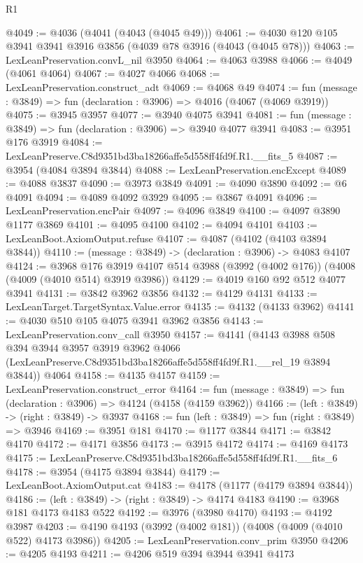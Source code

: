 \begin{lexlean}{R1}
\begin{coremodule}
@4049 := @4036 (@4041 (@4043 (@4045 @49)))
@4061 := @4030 @120 @105 @3941 @3941 @3916 @3856 (@4039 @78 @3916 (@4043 (@4045 @78)))
@4063 := LexLeanPreservation.convL_nil @3950
@4064 := @4063 @3988
@4066 := @4049 (@4061 @4064)
@4067 := @4027 @4066
@4068 := LexLeanPreservation.construct_adt
@4069 := @4068 @49
@4074 := fun (message : @3849) => fun (declaration : @3906) => @4016 (@4067 (@4069 @3919))
@4075 := @3945 @3957
@4077 := @3940 @4075 @3941
@4081 := fun (message : @3849) => fun (declaration : @3906) => @3940 @4077 @3941
@4083 := @3951 @176 @3919
@4084 := LexLeanPreserve.C8d9351bd3ba18266affe5d558ff4fd9f.R1.__fits_5
@4087 := @3954 (@4084 @3894 @3844)
@4088 := LexLeanPreservation.encExcept
@4089 := @4088 @3837
@4090 := @3973 @3849
@4091 := @4090 @3890
@4092 := @6 @4091
@4094 := @4089 @4092 @3929
@4095 := @3867 @4091
@4096 := LexLeanPreservation.encPair
@4097 := @4096 @3849
@4100 := @4097 @3890 @1177 @3869
@4101 := @4095 @4100
@4102 := @4094 @4101
@4103 := LexLeanBoot.AxiomOutput.refuse
@4107 := @4087 (@4102 (@4103 @3894 @3844))
@4110 := (message : @3849) -> (declaration : @3906) -> @4083 @4107
@4124 := @3968
    @176
    @3919
    @4107
    @514
    @3988
    (@3992 (@4002 @176))
    (@4008 (@4009 (@4010 @514) @3919 @3986))
@4129 := @4019 @160 @92 @512 @4077 @3941
@4131 := @3842 @3962 @3856
@4132 := @4129 @4131
@4133 := LexLeanTarget.TargetSyntax.Value.error
@4135 := @4132 (@4133 @3962)
@4141 := @4030 @510 @105 @4075 @3941 @3962 @3856
@4143 := LexLeanPreservation.conv_call @3950
@4157 := @4141
    (@4143
      @3988
      @508
      @394
      @3944
      @3957
      @3919
      @3962
      @4066
      (LexLeanPreserve.C8d9351bd3ba18266affe5d558ff4fd9f.R1.__rel_19 @3894 @3844))
    @4064
@4158 := @4135 @4157
@4159 := LexLeanPreservation.construct_error
@4164 := fun (message : @3849) => fun (declaration : @3906) => @4124 (@4158 (@4159 @3962))
@4166 := (left : @3849) -> (right : @3849) -> @3937
@4168 := fun (left : @3849) => fun (right : @3849) => @3946
@4169 := @3951 @181
@4170 := @1177 @3844
@4171 := @3842 @4170
@4172 := @4171 @3856
@4173 := @3915 @4172
@4174 := @4169 @4173
@4175 := LexLeanPreserve.C8d9351bd3ba18266affe5d558ff4fd9f.R1.__fits_6
@4178 := @3954 (@4175 @3894 @3844)
@4179 := LexLeanBoot.AxiomOutput.cat
@4183 := @4178 (@1177 (@4179 @3894 @3844))
@4186 := (left : @3849) -> (right : @3849) -> @4174 @4183
@4190 := @3968 @181 @4173 @4183 @522
@4192 := @3976 (@3980 @4170)
@4193 := @4192 @3987
@4203 := @4190 @4193 (@3992 (@4002 @181)) (@4008 (@4009 (@4010 @522) @4173 @3986))
@4205 := LexLeanPreservation.conv_prim @3950
@4206 := @4205 @4193
@4211 := @4206 @519 @394 @3944 @3941 @4173

\end{coremodule}
\end{lexlean}

